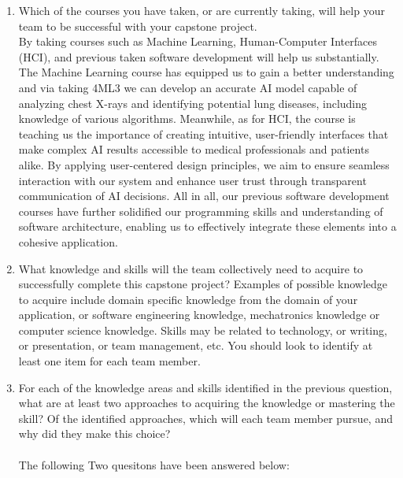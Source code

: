 \documentclass[12pt]{article}
\begin{document}
\begin{enumerate}
  \item Which of the courses you have taken, or are currently taking, will help
  your team to be successful with your capstone project. \\

  By taking courses such as Machine Learning, Human-Computer Interfaces (HCI), and previous taken software development will help us substantially. The Machine Learning course has equipped us to gain a better understanding and via taking 4ML3 we can develop an accurate AI model capable of analyzing chest X-rays and identifying potential lung diseases, including knowledge of various algorithms. Meanwhile, as for HCI, the course is teaching us the importance of creating intuitive, user-friendly interfaces that make complex AI results accessible to medical professionals and patients alike. By applying user-centered design principles, we aim to ensure seamless interaction with our system and enhance user trust through transparent communication of AI decisions. All in all, our previous software development courses have further solidified our programming skills and understanding of software architecture, enabling us to effectively integrate these elements into a cohesive application.
  
  \item What knowledge and skills will the team collectively need to acquire to
  successfully complete this capstone project?  Examples of possible knowledge
  to acquire include domain specific knowledge from the domain of your
  application, or software engineering knowledge, mechatronics knowledge or
  computer science knowledge.  Skills may be related to technology, or writing,
  or presentation, or team management, etc.  You should look to identify at
  least one item for each team member.
  \item For each of the knowledge areas and skills identified in the previous
  question, what are at least two approaches to acquiring the knowledge or
  mastering the skill?  Of the identified approaches, which will each team
  member pursue, and why did they make this choice? \\\\

    The following Two quesitons have been answered below: \\\\


\end{enumerate}
\end{document}
